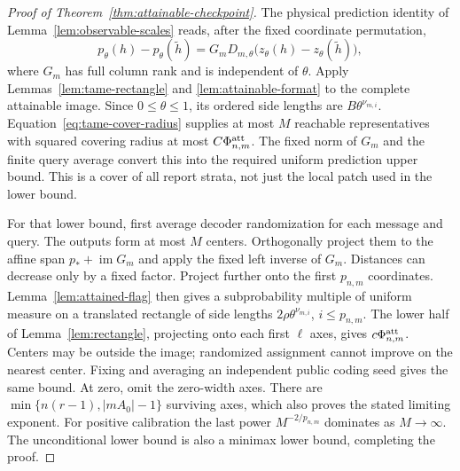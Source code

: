 \begin{proof}[Proof of Theorem~\ref{thm:attainable-checkpoint}]
The physical prediction identity of Lemma~\ref{lem:observable-scales}
reads, after the fixed coordinate permutation,
\begin{equation}\label{eq:flag-query-metric}
 p_\theta(h)-p_\theta(\widetilde h)
 =G_mD_{m,\theta}\bigl(z_\theta(h)-z_\theta(\widetilde h)\bigr),
\end{equation}
where $G_m$ has full column rank and is independent of $\theta$.
Apply Lemmas~\ref{lem:tame-rectangle} and
\ref{lem:attainable-format} to the complete attainable image. Since
$0\le\theta\le1$, its ordered side lengths are
$B\theta^{\nu_{m,i}}$. Equation~\eqref{eq:tame-cover-radius} supplies
at most $M$ reachable representatives with squared covering radius
at most $C\Phi^{\rm att}_{n,m}$. The fixed norm of $G_m$ and the
finite query average convert this into the required uniform prediction
upper bound. This is a cover of all report strata, not just the local
patch used in the lower bound.

For that lower bound, first average decoder randomization for each
message and query. The outputs form at most $M$ centers. Orthogonally
project them to the affine span $p_*+\operatorname{im}G_m$ and apply
the fixed left inverse of $G_m$. Distances can decrease only by a
fixed factor. Project further onto the first $p_{n,m}$ coordinates.
Lemma~\ref{lem:attained-flag} then gives a subprobability multiple of
uniform measure on a translated rectangle of side lengths
$2\rho\theta^{\nu_{m,i}}$, $i\le p_{n,m}$. The lower half of
Lemma~\ref{lem:rectangle}, projecting onto each first $\ell$ axes,
gives $c\Phi^{\rm att}_{n,m}$. Centers may be outside the image;
randomized assignment cannot improve on the nearest center. Fixing and
averaging an independent public coding seed gives the same bound.
At zero, omit the zero-width axes. There are
$\min\{n(r-1),|mA_0|-1\}$ surviving axes, which also proves the
stated limiting exponent. For positive calibration the last power
$M^{-2/p_{n,m}}$ dominates as $M\to\infty$. The unconditional lower
bound is also a minimax lower bound, completing the proof.
\end{proof}

